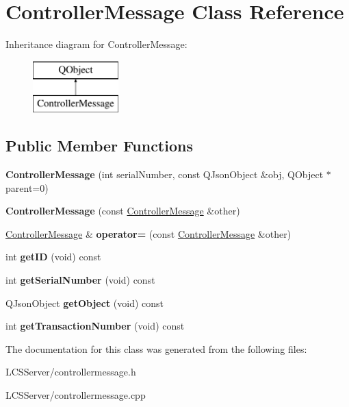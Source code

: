 \hypertarget{class_controller_message}{}\section{Controller\+Message Class Reference}
\label{class_controller_message}
Inheritance diagram for Controller\+Message\+:\begin{figure}[H]
\begin{center}
\leavevmode
\includegraphics[height=2.000000cm]{class_controller_message}
\end{center}
\end{figure}
\subsection*{Public Member Functions}
\begin{DoxyCompactItemize}
\item 
\mbox{\label{class_controller_message_a001cfe43b7b43f98c8082d6a4deb83b9}} 
{\bfseries Controller\+Message} (int serial\+Number, const Q\+Json\+Object \&obj, Q\+Object $\ast$parent=0)
\item 
\mbox{\label{class_controller_message_a8507bce7f49eafb7e76ed1baef82c550}} 
{\bfseries Controller\+Message} (const \hyperlink{class_controller_message}{Controller\+Message} \&other)
\item 
\mbox{\label{class_controller_message_ada26e02e79c474c6a348bbd84a865135}} 
\hyperlink{class_controller_message}{Controller\+Message} \& {\bfseries operator=} (const \hyperlink{class_controller_message}{Controller\+Message} \&other)
\item 
\mbox{\label{class_controller_message_a38313234269e6d4b554d20fb8076b182}} 
int {\bfseries get\+ID} (void) const
\item 
\mbox{\label{class_controller_message_af68860e095bc84883064fada63994c3c}} 
int {\bfseries get\+Serial\+Number} (void) const
\item 
\mbox{\label{class_controller_message_aef506f77c5a417938bb4342e6ec8591a}} 
Q\+Json\+Object {\bfseries get\+Object} (void) const
\item 
\mbox{\label{class_controller_message_a159aba76ff122b8247ddfbe087d2ee19}} 
int {\bfseries get\+Transaction\+Number} (void) const
\end{DoxyCompactItemize}


The documentation for this class was generated from the following files\+:\begin{DoxyCompactItemize}
\item 
L\+C\+S\+Server/controllermessage.\+h\item 
L\+C\+S\+Server/controllermessage.\+cpp\end{DoxyCompactItemize}
